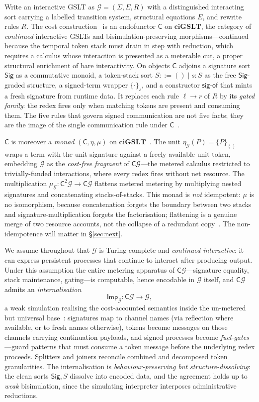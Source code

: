 \documentclass[11pt]{article}
\theoremstyle{plain}
\theoremstyle{definition}
\theoremstyle{remark}
\newcommand{\G}{\mathcal{G}}
\newcommand{\C}{\mathsf{C}}
\newcommand{\Sig}{\mathsf{Sig}}
\newcommand{\sigof}{\mathsf{sig\text{-}of}}
\newcommand{\Imp}{\mathsf{Imp}}
\newcommand{\unit}{\eta}
\newcommand{\mult}{\mu}
\newcommand{\ciGSLT}{\mathbf{ciGSLT}}
\begin{document}
Write an interactive GSLT as $\G=(\Sigma,E,R)$ with a distinguished interacting
sort carrying a labelled transition system, structural equations $E$, and
rewrite rules $R$. The cost construction~\cite{noteII} is an endofunctor $\C$ on
$\ciGSLT$, the category of \emph{continued} interactive GSLTs and
bisimulation-preserving morphisms---continued because the temporal token stack
must drain in step with reduction, which requires a calculus whose interaction
is presented as a meterable cut, a proper structural enrichment of bare
interactivity. On
objects $\C$ adjoins a signature sort $\Sig$ as a commutative monoid, a
token-stack sort $S ::= () \mid s\!:\!S$ as the free $\Sig$-graded structure, a
signed-term wrapper $\{\cdot\}_s$, and a constructor $\sigof$ that mints a fresh
signature from runtime data. It replaces each rule $\ell\to r$ of $R$ by its
\emph{gated family}: the redex fires only when matching tokens are present and
consuming them. The five rules that govern signed communication are not five
facts; they are the image of the single communication rule under
$\C$~\cite{noteI}.

$\C$ is moreover a \emph{monad} $(\C,\unit,\mult)$ on $\ciGSLT$~\cite{noteII}.
The unit $\unit_\G(P)=\{P\}_{()}$ wraps a term with the unit signature against a
freely available unit token, embedding $\G$ as the \emph{cost-free fragment} of
$\C\G$---the metered calculus restricted to trivially-funded interactions, where
every redex fires without net resource. The multiplication
$\mult_\G:\C^2\G\to\C\G$ flattens metered metering by multiplying nested
signatures and concatenating stacks-of-stacks. This monad is \emph{not}
idempotent: $\mult$ is no isomorphism, because concatenation forgets the
boundary between two stacks and signature-multiplication forgets the
factorisation; flattening is a genuine merge of two resource accounts, not the
collapse of a redundant copy~\cite{noteII}. The non-idempotence will matter in
\S\ref{sec:next}.

We assume throughout that $\G$ is Turing-complete and
\emph{continued-interactive}: it can express persistent processes that continue
to interact after producing output. Under this assumption the entire metering
apparatus of $\C\G$---signature equality, stack maintenance, gating---is
computable, hence encodable in $\G$ itself, and $\C\G$ admits an
\emph{internalisation}
\[
  \Imp_\G:\C\G\longrightarrow\G,
\]
a weak simulation realising the cost-accounted semantics inside the un-metered
but universal base~\cite{noteII}: signatures map to channel
names (via reflection where available, or to fresh names otherwise), tokens
become messages on those channels carrying continuation payloads, and signed
processes become \emph{fuel-gates}---guard patterns that must consume a token
message before the underlying redex proceeds. Splitters and joiners reconcile
combined and decomposed token granularities. The internalisation is
\emph{behaviour-preserving but structure-dissolving}: the clean sorts
$\Sig,S$ dissolve into encoded data, and the agreement holds up to \emph{weak}
bisimulation, since the simulating interpreter interposes administrative
reductions.
\end{document}

